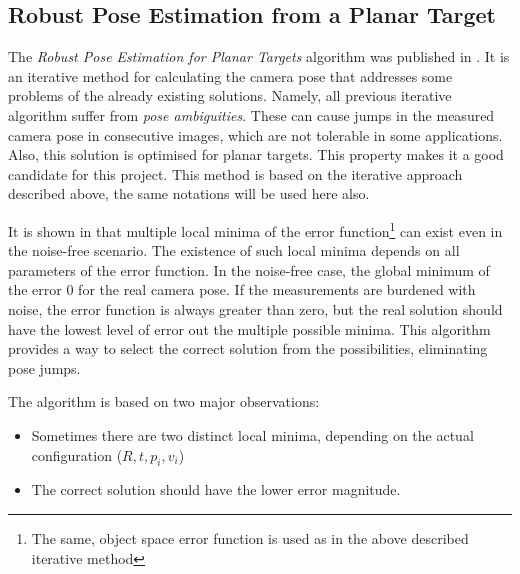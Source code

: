 \subsection{Robust Pose Estimation from a Planar Target}

The \textit{Robust Pose Estimation for Planar Targets} algorithm was published in \cite{robust}.
It is an iterative method for calculating the camera pose that addresses some problems of the already existing solutions.
Namely, all previous iterative algorithm suffer from \textit{pose ambiguities}\cite{robust}.
These can cause jumps in the measured camera pose in consecutive images, which are not tolerable in some applications.
Also, this solution is optimised for planar targets.
This property makes it a good candidate for this project.
This method is based on the iterative approach described above, the same notations will be used here also.

It is shown in \cite{robust} that multiple local minima of the error function\footnote{The same, object space error function is used as in the above described iterative method} can exist even in the noise-free scenario.
The existence of such local minima depends on all parameters of the error function.
In the noise-free case, the global minimum of the error 0 for the real camera pose.
If the measurements are burdened with noise, the error function is always greater than zero, but the real solution should have the lowest level of error out the multiple possible minima.
This algorithm provides a way to select the correct solution from the possibilities, eliminating pose jumps.

The algorithm is based on two major observations\cite{robust}:
\begin{itemize}
	\item Sometimes there are two distinct local minima, depending on the actual configuration ($R, t, p_i, v_i$)
	\item The correct solution should have the lower error magnitude.
\end{itemize}


